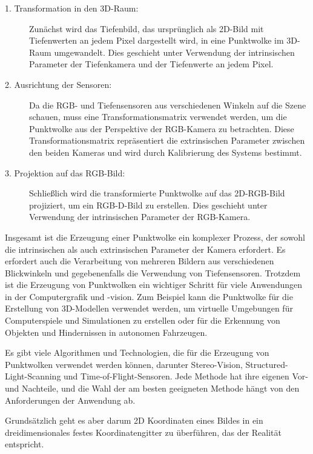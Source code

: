 \begin{description}
    \item[1. Transformation in den 3D-Raum:] Zunächst wird das Tiefenbild, das ursprünglich als 2D-Bild mit Tiefenwerten an jedem Pixel dargestellt wird, in eine Punktwolke im 3D-Raum umgewandelt. Dies geschieht unter Verwendung der intrinsischen Parameter der Tiefenkamera und der Tiefenwerte an jedem Pixel.
    
    \item [2. Ausrichtung der Sensoren:] Da die RGB- und Tiefensensoren aus verschiedenen Winkeln auf die Szene schauen, muss eine Transformationsmatrix verwendet werden, um die Punktwolke aus der Perspektive der RGB-Kamera zu betrachten. Diese Transformationsmatrix repräsentiert die extrinsischen Parameter zwischen den beiden Kameras und wird durch Kalibrierung des Systems bestimmt.
    
    \item[3. Projektion auf das RGB-Bild:] Schließlich wird die transformierte Punktwolke auf das 2D-RGB-Bild projiziert, um ein RGB-D-Bild zu erstellen. Dies geschieht unter Verwendung der intrinsischen Parameter der RGB-Kamera.
    \end{description}

    \cite[vgl.][Kapitel 5.3.1]{SWB-1681722674}

    


Insgesamt ist die Erzeugung einer Punktwolke ein komplexer Prozess, der sowohl die intrinsischen als auch extrinsischen Parameter der Kamera erfordert. Es erfordert auch die Verarbeitung von mehreren Bildern aus verschiedenen Blickwinkeln und gegebenenfalls die Verwendung von Tiefensensoren. Trotzdem ist die Erzeugung von Punktwolken ein wichtiger Schritt für viele Anwendungen in der Computergrafik und -vision. Zum Beispiel kann die Punktwolke für die Erstellung von 3D-Modellen verwendet werden, um virtuelle Umgebungen für Computerspiele und Simulationen zu erstellen oder für die Erkennung von Objekten und Hindernissen in autonomen Fahrzeugen.

Es gibt viele Algorithmen und Technologien, die für die Erzeugung von Punktwolken verwendet werden können, darunter Stereo-Vision, Structured-Light-Scanning und Time-of-Flight-Sensoren. Jede Methode hat ihre eigenen Vor- und Nachteile, und die Wahl der am besten geeigneten Methode hängt von den Anforderungen der Anwendung ab.

Grundsätzlich geht es aber darum 2D Koordinaten eines Bildes in ein dreidimensionales festes Koordinatengitter zu überführen, das der Realität entspricht.

